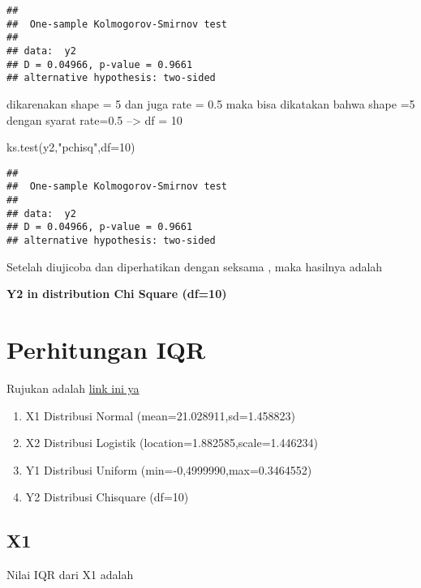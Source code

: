 \documentclass[
]{article}
\newenvironment{Shaded}{\begin{snugshade}}{\end{snugshade}}
\newcommand{\AttributeTok}[1]{\textcolor[rgb]{0.77,0.63,0.00}{#1}}
\newcommand{\DecValTok}[1]{\textcolor[rgb]{0.00,0.00,0.81}{#1}}
\newcommand{\FunctionTok}[1]{\textcolor[rgb]{0.00,0.00,0.00}{#1}}
\newcommand{\NormalTok}[1]{#1}
\newcommand{\StringTok}[1]{\textcolor[rgb]{0.31,0.60,0.02}{#1}}
\providecommand{\tightlist}{%
  \setlength{\itemsep}{0pt}\setlength{\parskip}{0pt}}
\begin{document}
\begin{verbatim}
## 
##  One-sample Kolmogorov-Smirnov test
## 
## data:  y2
## D = 0.04966, p-value = 0.9661
## alternative hypothesis: two-sided
\end{verbatim}

dikarenakan shape = 5 dan juga rate = 0.5 maka bisa dikatakan bahwa
shape =5 dengan syarat rate=0.5 --\textgreater{} df = 10

\begin{Shaded}
\begin{Highlighting}[]
\FunctionTok{ks.test}\NormalTok{(y2,}\StringTok{"pchisq"}\NormalTok{,}\AttributeTok{df=}\DecValTok{10}\NormalTok{)}
\end{Highlighting}
\end{Shaded}

\begin{verbatim}
## 
##  One-sample Kolmogorov-Smirnov test
## 
## data:  y2
## D = 0.04966, p-value = 0.9661
## alternative hypothesis: two-sided
\end{verbatim}

Setelah diujicoba dan diperhatikan dengan seksama , maka hasilnya adalah

\textbf{Y2 in distribution Chi Square (df=10)}

\hypertarget{perhitungan-iqr}{%
\section{Perhitungan IQR}\label{perhitungan-iqr}}

Rujukan adalah
\href{https://dc.etsu.edu/cgi/viewcontent.cgi?article=2187\&context=etd}{link
ini ya}

\begin{enumerate}
\def\labelenumi{\arabic{enumi}.}
\tightlist
\item
  X1 Distribusi Normal (mean=21.028911,sd=1.458823)
\item
  X2 Distribusi Logistik (location=1.882585,scale=1.446234)
\item
  Y1 Distribusi Uniform (min=-0,4999990,max=0.3464552)
\item
  Y2 Distribusi Chisquare (df=10)
\end{enumerate}

\hypertarget{x1-2}{%
\subsection{X1}\label{x1-2}}

Nilai IQR dari X1 adalah
\end{document}
